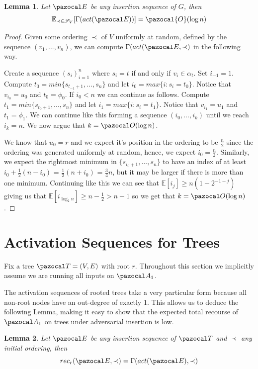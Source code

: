 \documentclass{report}
\newtheorem{lemma}{Lemma}
\begin{document}
\begin{lemma}\label{gamma lemma 1}
Let $\pazocal E$ be any insertion sequence of $G$, then
\[ \mathbb{E}_{\prec \in \mathcal{S}_V}[\Gamma(act(\pazocal E))] = \pazocal{O}(\log n) \]
\end{lemma}

\begin{proof}
Given some ordering $\prec$ of $V$ uniformly at random, defined by the sequence $(v_1,...,v_n)$, we can compute $\Gamma(act(\pazocal E, \prec)$ in the following way.

Create a sequence $(s_i)_{i=1}^n$ where $s_i = t$ if and only if $v_i \in \alpha_t$. Set $i_{-1}=1$. Compute $t_0 = min\{s_{t_{-1}+1},...,s_n\}$ and let $i_0=max\{i:s_i=t_0\}$. Notice that $v_{i_0} = u_0$ and $t_0 = \phi_0$. If $i_0 < n$ we can continue as follows. Compute $t_1 = min\{s_{t_{0}+1},...,s_n\}$ and let $i_1=max\{i:s_i=t_1\}$. Notice that $v_{i_1} = u_1$ and $t_1 = \phi_1$. We can continue like this forming a sequence $(i_0,...,i_k)$ until we reach $i_k = n$. We now argue that $k = \pazocal O(\log n)$.

We know that $u_0 = r$ and we expect it's position in the ordering to be $\frac{n}{2}$ since the ordering was generated uniformly at random, hence, we expect $i_0 = \frac{n}{2}$. Similarly, we expect the rightmost minimum in $\{s_{i_0+1},...,s_n\}$ to have an index of at least $i_0 + \frac{1}{2}(n - i_0)$ = $\frac{1}{2}(n+i_0)$ = $\frac{3}{4}n$, but it may be larger if there is more than one minimum. Continuing like this we can see that $\mathbb{E}[i_j] \geq n(1-2^{-1-j})$ giving us that $\mathbb{E}[i_{\log_{2}n}] \geq n-\frac{1}{2} > n - 1$ so we get that $k = \pazocal O(\log n)$.
\end{proof}

\section{Activation Sequences for Trees}

Fix a tree $\pazocal T=(V,E)$ with root $r$. Throughout this section we implicitly assume we are running all inputs on $\pazocal A_1$.

The activation sequences of rooted trees take a very particular form because all non-root nodes have an out-degree of exactly 1. This allows us to deduce the following Lemma, making it easy to show that the expected total recourse of $\pazocal A_1$ on trees under adversarial insertion is low.

\begin{lemma}\label{gamma lemma 2}
Let $\pazocal E$ be any insertion sequence of $\pazocal T$ and $\prec$ any initial ordering, then
\[ rec_r(\pazocal E, \prec) = \Gamma(act(\pazocal E), \prec) \]
\end{lemma}
\end{document}
